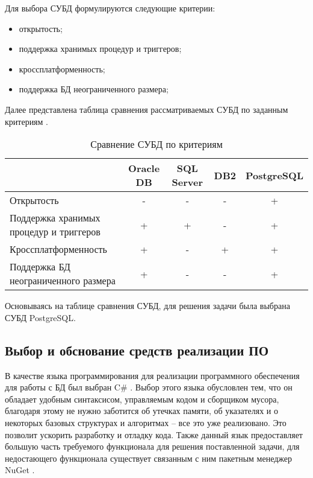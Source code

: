 \documentclass{bmstu}
\begin{document}
Для выбора СУБД формулируются следующие критерии:

\begin{itemize}
	\item открытость;
	\item поддержка хранимых процедур и триггеров;
	\item кроссплатформенность;
	\item поддержка БД неограниченного размера;
\end{itemize}

Далее представлена таблица сравнения рассматриваемых СУБД по заданным критериям \cite{orc-db, mssql, pg, db2}.

\begin{table}[H]
	\caption{Сравнение СУБД по критериям}
	\begin{center}
		\begin{tabular}{| p{5 cm} | c | c | c | c |} 
			\hline
			
			\textbf{} & \textbf{Oracle DB} & \textbf{SQL Server} & \textbf{DB2} & \textbf{PostgreSQL} \\  
			
			\hline
			
			Открытость & - & - & - & + \\
			
			\hline
			
			Поддержка хранимых процедур и триггеров & + & + & - & + \\
			
			\hline
			
			Кроссплатформенность & + & - & + & + \\
			
			\hline
			
			Поддержка БД неограниченного размера & + & - & - & + \\
			
			\hline
		\end{tabular}
	\end{center}
\end{table}

Основываясь на таблице сравнения СУБД, для решения задачи была выбрана СУБД PostgreSQL.

\subsection*{Выбор и обснование средств реализации ПО}

В качестве языка программирования для реализации программного обеспечения для работы с БД был выбран C\# \cite{c-sharp}. Выбор этого языка обусловлен тем, что он обладает удобным синтаксисом, управляемым кодом и сборщиком мусора, благодаря этому не нужно заботится об утечках памяти, об указателях и о некоторых базовых структурах и алгоритмах -- все это уже реализовано. Это позволит ускорить разработку и отладку кода. Также данный язык предоставляет большую часть требуемого функционала для решения поставленной задачи, для недостающего функционала существует связанным с ним пакетным менеджер NuGet \cite{nuget}.
\end{document}
